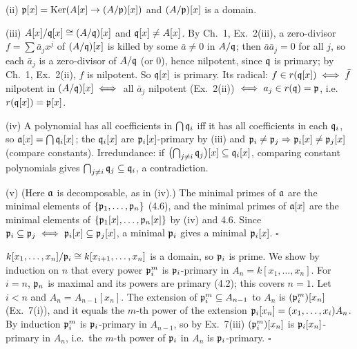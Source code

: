 \documentclass[11pt]{article}
\begin{document}
(ii) $\mathfrak p[x]=\operatorname{Ker}(A[x]\to(A/\mathfrak p)[x])$ and $(A/\mathfrak p)[x]$ is a domain.

(iii) $A[x]/\mathfrak q[x]\cong(A/\mathfrak q)[x]$ and $\mathfrak q[x]\ne A[x]$. By Ch.~1, Ex.~2(iii), a zero-divisor $f=\sum\bar a_jx^j$ of $(A/\mathfrak q)[x]$ is killed by some $\bar a\ne0$ in $A/\mathfrak q$; then $\bar a\bar a_j=0$ for all $j$, so each $\bar a_j$ is a zero-divisor of $A/\mathfrak q$ (or $0$), hence nilpotent, since $\mathfrak q$ is primary; by Ch.~1, Ex.~2(ii), $f$ is nilpotent. So $\mathfrak q[x]$ is primary. Its radical: $f\in r(\mathfrak q[x])\iff\bar f$ nilpotent in $(A/\mathfrak q)[x]\iff$ all $\bar a_j$ nilpotent (Ex.~2(ii)) $\iff a_j\in r(\mathfrak q)=\mathfrak p$, i.e.\ $r(\mathfrak q[x])=\mathfrak p[x]$.

(iv) A polynomial has all coefficients in $\bigcap\mathfrak q_i$ iff it has all coefficients in each $\mathfrak q_i$, so $\mathfrak a[x]=\bigcap\mathfrak q_i[x]$; the $\mathfrak q_i[x]$ are $\mathfrak p_i[x]$-primary by (iii) and $\mathfrak p_i\ne\mathfrak p_j\Rightarrow\mathfrak p_i[x]\ne\mathfrak p_j[x]$ (compare constants). Irredundance: if $\bigl(\bigcap_{j\ne i}\mathfrak q_j\bigr)[x]\subseteq\mathfrak q_i[x]$, comparing constant polynomials gives $\bigcap_{j\ne i}\mathfrak q_j\subseteq\mathfrak q_i$, a contradiction.

(v) (Here $\mathfrak a$ is decomposable, as in (iv).) The minimal primes of $\mathfrak a$ are the minimal elements of $\{\mathfrak p_1,\dots,\mathfrak p_n\}$ (4.6), and the minimal primes of $\mathfrak a[x]$ are the minimal elements of $\{\mathfrak p_1[x],\dots,\mathfrak p_n[x]\}$ by (iv) and 4.6. Since $\mathfrak p_i\subseteq\mathfrak p_j\iff\mathfrak p_i[x]\subseteq\mathfrak p_j[x]$, a minimal $\mathfrak p_i$ gives a minimal $\mathfrak p_i[x]$. \hfill$\square$

\pf
$k[x_1,\dots,x_n]/\mathfrak p_i\cong k[x_{i+1},\dots,x_n]$ is a domain, so $\mathfrak p_i$ is prime. We show by induction on $n$ that every power $\mathfrak p_i^m$ is $\mathfrak p_i$-primary in $A_n=k[x_1,\dots,x_n]$. For $i=n$, $\mathfrak p_n$ is maximal and its powers are primary (4.2); this covers $n=1$. Let $i<n$ and $A_n=A_{n-1}[x_n]$. The extension of $\mathfrak p_i^m\subseteq A_{n-1}$ to $A_n$ is $(\mathfrak p_i^m)[x_n]$ (Ex.~7(i)), and it equals the $m$-th power of the extension $\mathfrak p_i[x_n]=(x_1,\dots,x_i)A_n$. By induction $\mathfrak p_i^m$ is $\mathfrak p_i$-primary in $A_{n-1}$, so by Ex.~7(iii) $(\mathfrak p_i^m)[x_n]$ is $\mathfrak p_i[x_n]$-primary in $A_n$, i.e.\ the $m$-th power of $\mathfrak p_i$ in $A_n$ is $\mathfrak p_i$-primary. \hfill$\square$
\end{document}

